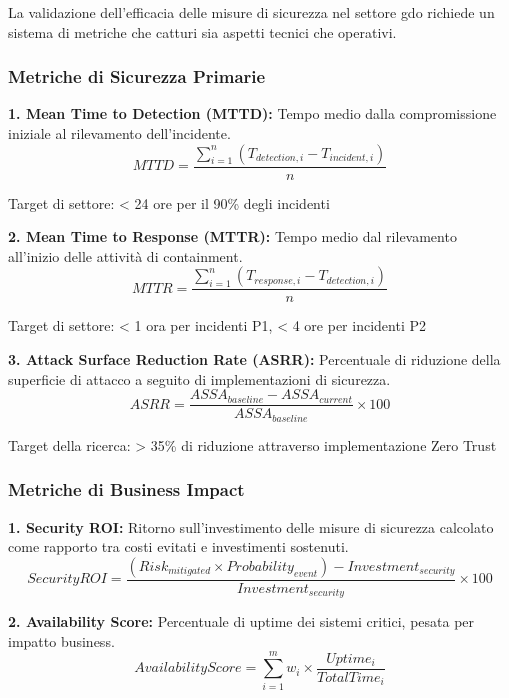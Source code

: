 La validazione dell'efficacia delle misure di sicurezza nel settore \gls{gdo} richiede un sistema di metriche che catturi sia aspetti tecnici che operativi.

\subsubsection{Metriche di Sicurezza Primarie}

\textbf{1. Mean Time to Detection (MTTD):}
Tempo medio dalla compromissione iniziale al rilevamento dell'incidente.
\begin{equation}
MTTD = \frac{\sum_{i=1}^{n} (T_{detection,i} - T_{incident,i})}{n}
\end{equation}

Target di settore: < 24 ore per il 90\% degli incidenti

\textbf{2. Mean Time to Response (MTTR):}
Tempo medio dal rilevamento all'inizio delle attività di containment.
\begin{equation}
MTTR = \frac{\sum_{i=1}^{n} (T_{response,i} - T_{detection,i})}{n}
\end{equation}

Target di settore: < 1 ora per incidenti P1, < 4 ore per incidenti P2

\textbf{3. Attack Surface Reduction Rate (ASRR):}
Percentuale di riduzione della superficie di attacco a seguito di implementazioni di sicurezza.
\begin{equation}
ASRR = \frac{ASSA_{baseline} - ASSA_{current}}{ASSA_{baseline}} \times 100
\end{equation}

Target della ricerca: > 35\% di riduzione attraverso implementazione Zero Trust

\subsubsection{Metriche di Business Impact}

\textbf{1. Security ROI:}
Ritorno sull'investimento delle misure di sicurezza calcolato come rapporto tra costi evitati e investimenti sostenuti.
\begin{equation}
SecurityROI = \frac{(Risk_{mitigated} \times Probability_{event}) - Investment_{security}}{Investment_{security}} \times 100
\end{equation}

\textbf{2. Availability Score:}
Percentuale di uptime dei sistemi critici, pesata per impatto business.
\begin{equation}
AvailabilityScore = \sum_{i=1}^{m} w_i \times \frac{Uptime_i}{TotalTime_i}
\end{equation}

